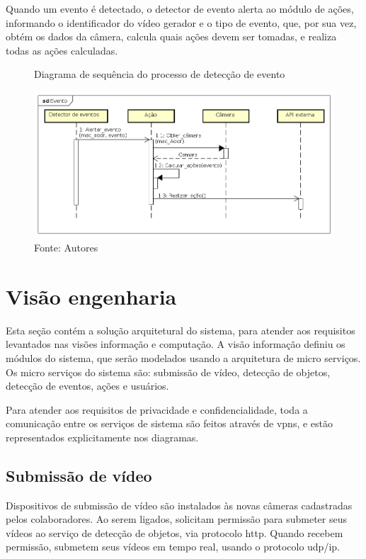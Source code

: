\documentclass[]{politex}
\begin{document}
Quando um evento é detectado, o detector de evento alerta ao módulo de ações, informando o identificador do vídeo gerador e o tipo de evento, que, por sua vez, obtém os dados da câmera, calcula quais ações devem ser tomadas, e realiza todas as ações calculadas.

\begin{figure}[H]
    \centering
    \caption{Diagrama de sequência do processo de detecção de evento}
    \includegraphics[width=\textwidth]{Evento}
    \caption*{Fonte: Autores}
    \label{fig:evento}
\end{figure}

\section{Visão engenharia}
Esta seção contém a solução arquitetural do sistema, para atender aos requisitos levantados nas visões informação e computação. A visão informação definiu os módulos do sistema, que serão modelados usando a arquitetura de micro serviços. Os micro serviços do sistema são: submissão de vídeo, detecção de objetos, detecção de eventos, ações e usuários.

Para atender aos requisitos de privacidade e confidencialidade, toda a comunicação entre os serviços de sistema são feitos através de \acrshort{vpn}s, e estão representados explicitamente nos diagramas.

\subsection{Submissão de vídeo}
Dispositivos de submissão de vídeo são instalados às novas câmeras cadastradas pelos colaboradores. Ao serem ligados, solicitam permissão para submeter seus vídeos ao serviço de detecção de objetos, via protocolo \acrshort{http}. Quando recebem permissão, submetem seus vídeos em tempo real, usando o protocolo \acrlong{udp}/\acrshort{ip}.
\end{document}
